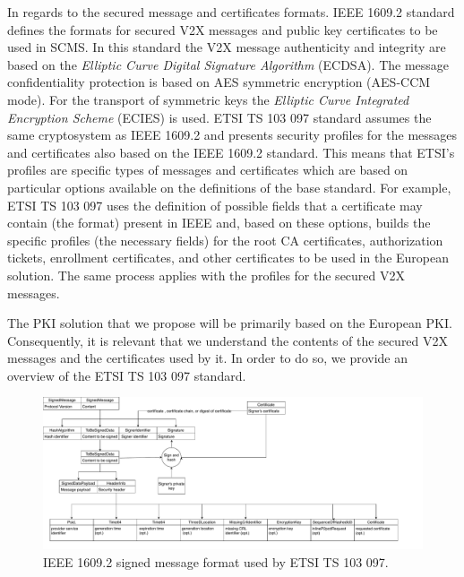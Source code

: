 In regards to the secured message and certificates formats. IEEE 1609.2 \cite{iee_formats} standard defines the formats for secured V2X  messages and public key certificates to be used in SCMS. In this standard the V2X message authenticity and integrity are based on the \textit{Elliptic Curve Digital Signature Algorithm} (ECDSA). The message confidentiality protection is based on AES symmetric encryption (AES-CCM mode). For the transport of symmetric keys the \textit{Elliptic Curve Integrated Encryption Scheme} (ECIES) is used. ETSI TS 103 097 standard \cite{etsi_formats} assumes the same cryptosystem as IEEE 1609.2 and presents security profiles for the messages and certificates also based on the IEEE 1609.2 standard. This means that ETSI's profiles are specific types of messages and certificates which are based on particular options available on the definitions of the base standard. For example, ETSI TS 103 097 uses the definition of possible fields that a certificate may contain (the format) present in IEEE and, based on these options, builds the specific profiles (the necessary fields) for the root CA certificates, authorization tickets, enrollment certificates, and other certificates to be used in the European solution. The same process applies with the profiles for the secured V2X messages. 

The PKI solution that we propose will be primarily based on the European PKI. Consequently, it is relevant that we understand the contents of the secured V2X messages and the certificates used by it. In order to do so, we provide an overview of the ETSI TS 103 097 standard. 

\begin{figure}
	\centering
	\includegraphics[width=1.1\textwidth]{Figures/message_format.pdf}
	\caption{\label{fig:signed_message}IEEE 1609.2 signed message format used by ETSI TS 103 097.}
\end{figure}


